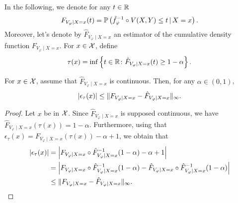 In the following, we denote for any $t\in\mathbb{R}$
\begin{equation*}
  F_{V_\varphi\mid X=x}(t)
  = \mathbb{P}\left({\tilde{f}_{\varphi}^{-1}\circ V(X,Y)\le t \,\vert\, X=x}\right).
\end{equation*}
%
Moreover, let's denote by $\hat{F}_{V_\varphi\mid X=x}$ an estimator of the cumulative density function $F_{V_\varphi\mid X=x}$.
For $x\in\mathcal{X}$, define
\begin{equation*}
  \tau(x) = \inf\left\{{t\in\mathbb{R}\colon \hat{F}_{V_\varphi\mid X=x}(t)\ge 1-\alpha}\right\}.
\end{equation*}

\begin{lemma}\label{lem:link-cdf}
  For $x\in\mathcal{X}$, assume that $\hat{F}_{V_\varphi\mid X=x}$ is continuous.
  Then, for any $\alpha\in(0,1)$, 
  \begin{equation*}
    \left\lvert{\epsilon_{\tau}(x)}\right\rvert
    \le \|{F_{V_\varphi\mid X=x} - \hat{F}_{V_\varphi\mid X=x}}\|_{\infty}.
  \end{equation*}
\end{lemma}

\begin{proof}
  Let $x$ be in $\mathcal{X}$. Since $\hat{F}_{V_\varphi\mid X=x}$ is supposed continuous, we have $\hat{F}_{V_\varphi\mid X=x}(\tau(x))=1-\alpha$.
  Furthermore, using that $\epsilon_{\tau}(x)=F_{V_\varphi\mid X=x}(\tau(x))-\alpha+1$, we obtain that
  \begin{align*}
    \left\lvert{\epsilon_{\tau}(x)}\right\rvert
    &= \left\lvert{F_{V_\varphi\mid X=x} \circ \hat{F}_{V_\varphi\mid X=x}^{-1}(1-\alpha) - \alpha + 1}\right\rvert
    \\
    &= \left\lvert{F_{V_\varphi\mid X=x} \circ \hat{F}_{V_\varphi\mid X=x}^{-1}(1-\alpha) - \hat{F}_{V_\varphi\mid X=x} \circ \hat{F}_{V_\varphi\mid X=x}^{-1}(1-\alpha)}\right\rvert
    \\
    &\le \|{F_{V_\varphi\mid X=x} - \hat{F}_{V_\varphi\mid X=x}}\|_{\infty}.
  \end{align*}
\end{proof}